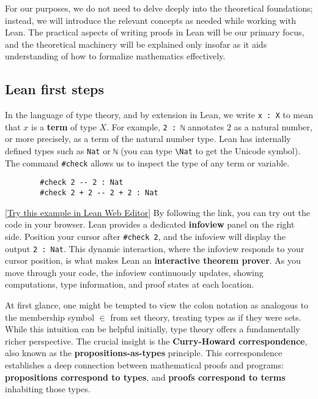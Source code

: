 For our purposes, we do not need to delve deeply into the theoretical foundations; 
instead, we will introduce the relevant concepts as needed while working with Lean. 
The practical aspects of writing proofs in Lean will be our primary focus, 
and the theoretical machinery will be explained only insofar as it aids understanding 
of how to formalize mathematics effectively.
\subsection{Lean first steps}

In the language of type theory, and by extension in Lean, we write \lstinline[language=lean]|x : X| 
to mean that $x$ is a \textbf{term} of type $X$. 
For example, \lstinline[language=lean]|2 : ℕ| annotates $2$ as a natural number, 
or more precisely, as a term of the natural number type. 
Lean has internally defined types such as \lstinline[language=lean]|Nat| or \lstinline[language=lean]|ℕ| 
(you can type \texttt{\textbackslash Nat} to get the Unicode symbol). 
The command \lstinline[language=lean]|#check| allows us to inspect the type of any term or variable.
\begin{example}\mbox{}

    \begin{lstlisting}
        #check 2 -- 2 : Nat
        #check 2 + 2 -- 2 + 2 : Nat
    \end{lstlisting}
     [\href{https://live.lean-lang.org/#codez=MQYwFgpiDWAEBMAoUkYNgagUA}{Try this example in Lean Web Editor}]
By following the link, you can try out the code in your browser.
Lean provides a dedicated \textbf{infoview} panel on the right side. 
Position your cursor after \lstinline[language=lean]|#check 2|, 
and the infoview will display the output \lstinline[language=lean]|2 : Nat|. 
This dynamic interaction, where the infoview responds to your cursor position, is 
what makes Lean an \textbf{interactive theorem prover}. 
As you move through your code, the infoview continuously updates, 
showing computations, type information, and proof states at each location.
\end{example}
At first glance, one might be tempted to view the colon notation as analogous to the membership 
symbol $\in$ from set theory, treating types as if they were sets. 
While this intuition can be helpful initially, type theory offers a fundamentally richer perspective. 
The crucial insight is the \textbf{Curry-Howard correspondence}, 
also known as the \textbf{propositions-as-types} principle. 
This correspondence establishes a deep connection between mathematical proofs and programs: 
\textbf{propositions correspond to types}, and \textbf{proofs correspond to terms} inhabiting those types. 

